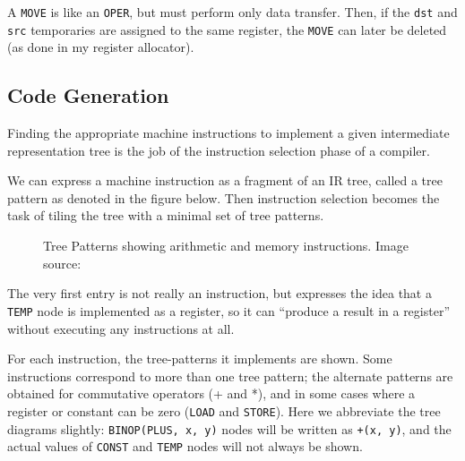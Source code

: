 A \texttt{MOVE}
is like an
\texttt{OPER},
but must perform only data transfer. Then, if the
\texttt{dst} and
\texttt{src}
temporaries are assigned to the same register, the
\texttt{MOVE}
can later be deleted (as done in my register allocator).

\hypertarget{code-generation}{%
\subsection{Code Generation}\label{code-generation}}

Finding the appropriate machine instructions to implement a given
intermediate representation tree is the job of the instruction selection
phase of a compiler.

We can express a machine instruction as a fragment of an IR tree, called
a tree pattern as denoted in the figure below. Then instruction
selection becomes the task of tiling the tree with a minimal set of tree
patterns.

\begin{figure}
\centering
{}
\caption{Tree Patterns showing arithmetic and memory instructions. Image source: \cite{tigerbook}}
\end{figure}

The very first entry is not really an instruction, but expresses the
idea that a
\texttt{TEMP}
node is implemented as a register, so it can ``produce a result in a
register'' without executing any instructions at all.

For each instruction, the tree-patterns it implements are shown. Some
instructions correspond to more than one tree pattern; the alternate
patterns are obtained for commutative operators (+ and *), and in some
cases where a register or constant can be zero
(\texttt{LOAD}
and
\texttt{STORE}).
Here we abbreviate the tree diagrams slightly:
\texttt{BINOP(PLUS, x, y)}
nodes will be written as
\texttt{+(x, y)},
and the actual values of
\texttt{CONST}
and
\texttt{TEMP}
nodes will not always be shown.

